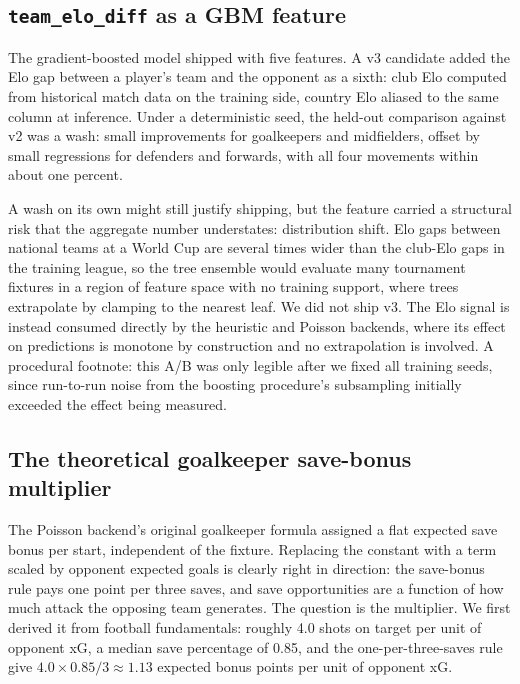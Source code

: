 \subsection{\texttt{team\_elo\_diff} as a GBM feature}
\label{sec:negative-elo-feature}

The gradient-boosted model \citep{ke2017lightgbm} shipped with five
features. A v3 candidate added the Elo gap between a player's team
and the opponent \citep{elo1978rating, hvattum2010using} as a sixth:
club Elo computed from historical match data on the training side,
country Elo aliased to the same column at inference. Under a
deterministic seed, the held-out comparison against v2 was a wash:
small improvements for goalkeepers and midfielders, offset by small
regressions for defenders and forwards, with all four movements
within about one percent.

A wash on its own might still justify shipping, but the feature
carried a structural risk that the aggregate number understates:
distribution shift. Elo gaps between national teams at a World Cup
are several times wider than the club-Elo gaps in the training
league, so the tree ensemble would evaluate many tournament fixtures
in a region of feature space with no training support, where trees
extrapolate by clamping to the nearest leaf. We did not ship v3. The
Elo signal is instead consumed directly by the heuristic and Poisson
backends, where its effect on predictions is monotone by construction
and no extrapolation is involved. A procedural footnote: this A/B was
only legible after we fixed all training seeds, since run-to-run
noise from the boosting procedure's subsampling initially exceeded
the effect being measured.

\subsection{The theoretical goalkeeper save-bonus multiplier}
\label{sec:negative-gk-multiplier}

The Poisson backend's original goalkeeper formula assigned a flat
expected save bonus per start, independent of the fixture. Replacing
the constant with a term scaled by opponent expected goals is clearly
right in direction: the save-bonus rule pays one point per three
saves, and save opportunities are a function of how much attack the
opposing team generates. The question is the multiplier. We first
derived it from football fundamentals: roughly 4.0 shots on target
per unit of opponent xG, a median save percentage of 0.85, and the
one-per-three-saves rule give $4.0 \times 0.85 / 3 \approx 1.13$
expected bonus points per unit of opponent xG.

